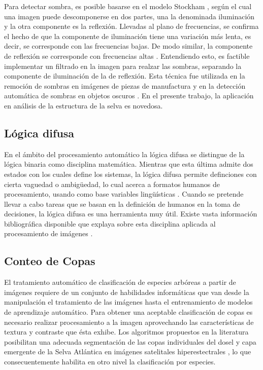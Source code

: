 Para detectar sombra, es posible basarse en el modelo Stockham \cite{stockham_image_1972}, según el cual una imagen puede descomponerse en dos partes, una la denominada iluminación y la otra componente es la reflexión. Llevadas al plano de frecuencias, se confirma el hecho de que la componente de iluminación tiene una variación más lenta, es decir, se corresponde con las frecuencias bajas. De modo similar, la componente de reflexión se corresponde con frecuencias altas \cite{oppenheim_nonlinear_1968}. Entendiendo esto, es factible implementar un filtrado en la imagen para realzar las sombras, separando la componente de iluminación de la de reflexión. Esta técnica fue utilizada en la remoción de sombras en imágenes de piezas de manufactura \cite{yang_research_2012} y en la detección automática de sombras en objetos oscuros \cite{etemadnia_automatic_2003}. En el presente trabajo, la aplicación en análisis de la estructura de la selva es novedosa.


\subsection{Lógica difusa} 
En el ámbito del procesamiento automático la lógica difusa se distingue de la lógica binaria como disciplina matemática. Mientras que esta última admite dos estados con los cuales define los sistemas, la lógica difusa permite definciones con cierta vaguedad o ambigüedad, lo cual acerca a formatos humanos de procesamiento, usando como base variables lingüísticas \cite{zadeh_concept_1975}. Cuando se pretende llevar a cabo tareas que se basan en la definición de humanos en la toma de decisiones, la lógica difusa es una herramienta muy útil. Existe vasta información bibliográfica disponible que explaya sobre esta disciplina aplicada al procesamiento de imágenes \cite{duarte_velasco_aplicaciones_2000, calier_segmentacion_2013, gutierrez_uso_2005}.
\subsection{Conteo de Copas}
El tratamiento automático de clasificación de especies arbóreas a partir de imágenes requiere de un conjunto de habilidades informáticas que van desde la manipulación el tratamiento de las imágenes hasta el entrenamiento de modelos de aprendizaje automático. Para obtener una aceptable clasificación de copas es necesario realizar procesamiento a la imagen aprovechando las características de textura y contraste que ésta exhibe. Los algoritmos propuestos en la literatura posibilitan una adecuada segmentación de las copas individuales del dosel y capa emergente de la Selva Atlántica en imágenes satelitales hiperestectrales \cite{ferreira_tree_2019}, lo que consecuentemente habilita en otro nivel la clasificación por especies. 

